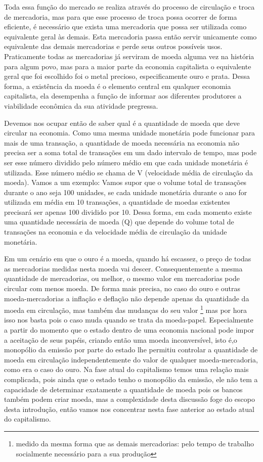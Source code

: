 Toda essa função do mercado se realiza através do processo de circulação e troca de mercadoria, mas para  que esse processo de troca possa ocorrer de forma eficiente, é necessário que exista uma mercadoria que possa ser utilizada como equivalente geral às demais. Esta mercadoria passa então servir unicamente como equivalente das demais mercadorias e perde seus outros possíveis usos. Praticamente todas as mercadorias já serviram de moeda alguma vez na história para algum povo, mas para a maior parte da economia capitalista o equivalente geral que foi escolhido foi o metal precioso, especificamente ouro e prata. Dessa forma, a existência da moeda é o elemento central em qualquer economia capitalista, ela desempenha a função de informar aos diferentes produtores a viabilidade econômica da sua atividade pregressa.

Devemos nos ocupar então de saber qual é a quantidade de moeda que deve circular na economia. Como uma mesma unidade monetária pode funcionar para mais de uma transação, a quantidade de moeda necessária na economia não precisa ser a soma total de transações em um dado intervalo de tempo, mas pode ser esse número dividido pelo número médio em que cada unidade monetária é utilizada. Esse número médio se chama de V (velocidade média de circulação da moeda). Vamos a um exemplo: Vamos supor que o volume total de transações durante o ano seja 100 unidades, se cada unidade monetária durante o ano for utilizada em média em 10 transações, a quantidade de moedas existentes  precisará ser apenas 100 dividido por 10. Dessa forma, em cada momento existe uma quantidade necessária de moeda (Q) que depende do volume total de transações na economia e da velocidade média de circulação da unidade monetária.

Em um cenário em que o ouro é a moeda, quando há escassez, o preço de todas as mercadorias medidas nesta moeda vai descer. Consequentemente a mesma quantidade de mercadorias, ou melhor, o mesmo valor em mercadorias pode circular com menos moeda.  De forma mais precisa, no caso do ouro e outras moeda-mercadorias a inflação e deflação não depende apenas da quantidade da moeda em circulação, mas também das mudanças do seu valor \footnote{medido da mesma forma que as demais mercadorias: pelo tempo de trabalho socialmente necessário para a sua produção} mas por hora isso nos basta pois  o caso muda quando se trata da moeda-papel. Especialmente a partir do momento que o estado dentro de uma economia nacional pode impor a aceitação de seus papéis, criando então uma moeda inconversível, isto é,o monopólio da emissão por parte do estado lhe permitiu controlar a quantidade de moeda em circulação independentemente do valor de qualquer moeda-mercadoria, como era o caso do ouro. Na fase atual do capitalismo temos uma relação mais complicada, pois ainda que o estado tenho o monopólio da emissão, ele não tem a capacidade de determinar exatamente a quantidade de moeda pois os bancos também podem criar moeda, mas a complexidade desta discussão foge do escopo desta introdução, então vamos nos concentrar nesta fase anterior ao estado atual do capitalismo.

